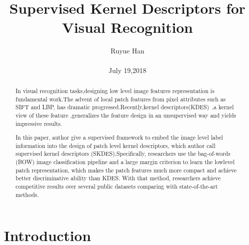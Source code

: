 \documentclass[10pt,twocolumn,letterpaper]{article}
\begin{document}
\title{Supervised Kernel Descriptors for Visual Recognition}

\author{Ruyue Han\\\\July 19,2018}

\maketitle


\begin{abstract}
   In visual recognition tasks,designing low level image features representation is fundamental work.The advent of local patch features from pixel attributes such as SIFT and LBP, has dramatic progressed.Recently,kernel descriptors(KDES)~\cite{Kernel2010bibtex},a kernel view of these feature ,generalizes the feature design in an unsupervised way and yields impressive results.
\par In this paper, author give a supervised framework to embed the image level label information into the design of patch level kernel descriptors, which author call supervised kernel descriptors (SKDES).Specifically, researchers use the 
bag-of-words (BOW) image classification pipeline and a large margin criterion to learn the lowlevel patch representation, which makes the patch features much more compact and achieve better discriminative ability than KDES. With that method, researchers achieve competitive results over several public datasets comparing with state-of-the-art methods.
   
\end{abstract}

\section{Introduction}
\end{document}
